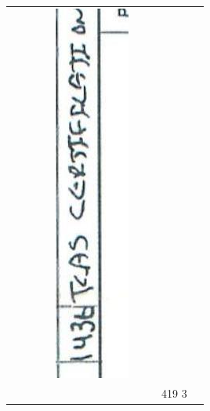 \documentclass[10pt]{article}
\begin{document}
\begin{center}
\begin{tabular}{|c|c|c|c|c|c|c|c|c|c|c|}
{} &  &  &  &  \\
\hline
 &  &  &  & \multicolumn{3}{|l|}{\includegraphics[max width=\textwidth]{2025_02_27_dd68c3d38de88f0516d9g-082(6)}
} &  &  &  &  \\
\hline
 &  &  &  &  &  &  &  &  & 419 3 &  \\
\hline
\end{tabular}
\end{center}
\end{document}
